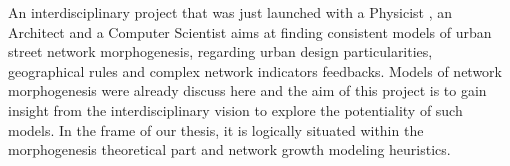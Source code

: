 An interdisciplinary project that was just launched with a Physicist , an Architect  and a Computer Scientist  aims at finding consistent models of urban street network morphogenesis, regarding urban design particularities, geographical rules and complex network indicators feedbacks. Models of network morphogenesis were already discuss here and the aim of this project is to gain insight from the interdisciplinary vision to explore the potentiality of such models. In the frame of our thesis, it is logically situated within the morphogenesis theoretical part and network growth modeling heuristics.












